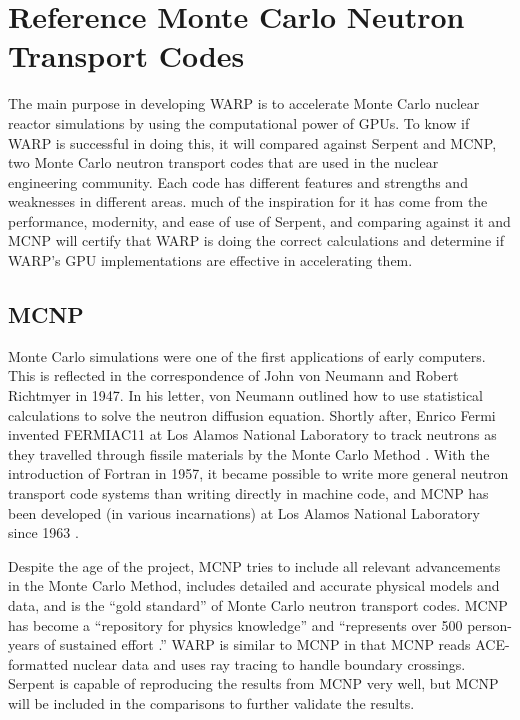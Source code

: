 \section{Reference Monte Carlo Neutron Transport Codes}

The main purpose in developing WARP is to accelerate Monte Carlo nuclear reactor simulations by using the computational power of GPUs.  To know if WARP is successful in doing this, it will compared against Serpent and MCNP, two Monte Carlo neutron transport codes that are used in the nuclear engineering community.  Each code has different features and strengths and weaknesses in different areas.  much of the inspiration for it has come from the performance, modernity, and ease of use of Serpent, and comparing against it and MCNP will certify that WARP is doing the correct calculations and determine if WARP's GPU implementations are effective in accelerating them.  

\subsection{MCNP}

Monte Carlo simulations were one of the first applications of early computers.   This is reflected in the correspondence of John von Neumann and  Robert Richtmyer  in 1947.  In his letter, von Neumann outlined how to use statistical calculations to solve the neutron diffusion equation.  Shortly after, Enrico Fermi invented FERMIAC11 at Los Alamos National Laboratory to track neutrons as they travelled through fissile materials by the Monte Carlo Method \cite{mcnp}.  With the introduction of Fortran in 1957, it became possible to write more general neutron transport code systems than writing directly in machine code, and MCNP has been developed (in various incarnations) at Los Alamos National Laboratory since 1963 \cite{mcnp}.
 
Despite the age of the project, MCNP tries to include all relevant advancements in the Monte Carlo Method, includes detailed and accurate physical models and data, and is the ``gold standard'' of Monte Carlo neutron transport codes.  MCNP has become a ``repository for physics knowledge'' and ``represents over 500 person-years of sustained effort \cite{mcnp}.''   WARP is similar to MCNP in that MCNP reads ACE-formatted nuclear data and uses ray tracing to handle boundary crossings.  Serpent is capable of reproducing the results from MCNP very well, but MCNP will be included in the comparisons to further validate the results.

